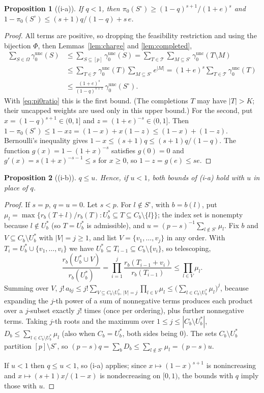 \documentclass[11pt]{article}
\newtheorem{proposition}{Proposition}
\theoremstyle{remark}
\newcommand{\unc}{\mathrm{unc}}
\newcommand{\gu}{\gamma_0^{\unc}}
\begin{document}
\begin{proposition}[(i-a)]
If $q<1$, then $\pi_0(S^\circ)\ge(1-q)^{s+1}/(1+e)^s$ and $1-\pi_0(S^\circ)\le (s+1)q/(1-q)+s\,e$.
\end{proposition}

\begin{proof}
All terms are positive, so dropping the feasibility restriction and using the bijection $\Phi$, then Lemmas~\ref{lem:charge} and \ref{lem:completed},
\[
\begin{aligned}
\sum_{S\in\Omega}\gu(S)&\le\sum_{S\subseteq[p]}\gu(S)=\sum_{T\in\mathcal T}\sum_{M\subseteq S^\circ}\gu(T\setminus M)\\
&\le\sum_{T\in\mathcal T}\gu(T)\sum_{M\subseteq S^\circ}e^{|M|}=(1+e)^s\sum_{T\in\mathcal T}\gu(T)\\
&\le\frac{(1+e)^s}{(1-q)^{s+1}}\,\gu(S^\circ).
\end{aligned}
\]
With \eqref{eq:pi0ratio} this is the first bound. (The completions $T$ may have $|T|>K$; their uncapped weights are used only in this upper bound.) For the second, put $x=(1-q)^{s+1}\in(0,1]$ and $z=(1+e)^{-s}\in(0,1]$. Then $1-\pi_0(S^\circ)\le 1-xz=(1-x)+x(1-z)\le(1-x)+(1-z)$. Bernoulli's inequality gives $1-x\le(s+1)q\le (s+1)q/(1-q)$. The function $g(x)=1-(1+x)^{-s}$ satisfies $g(0)=0$ and $g'(x)=s(1+x)^{-s-1}\le s$ for $x\ge0$, so $1-z=g(e)\le se$.
\end{proof}

\begin{proposition}[(i-b)]
$q\le u$. Hence, if $u<1$, both bounds of (i-a) hold with $u$ in place of $q$.
\end{proposition}

\begin{proof}
If $s=p$, $q=u=0$. Let $s<p$. For $l\notin S^\circ$, with $b=b(l)$, put $\mu_l=\max\{r_b(T+l)/r_b(T):U_b^*\subseteq T\subseteq C_b\setminus\{l\}\}$; the index set is nonempty because $l\notin U_b^*$ (so $T=U_b^*$ is admissible), and $u=(p-s)^{-1}\sum_{l\notin S^\circ}\mu_l$. Fix $b$ and $V\subseteq C_b\setminus U_b^*$ with $|V|=j\ge1$, and list $V=\{v_1,\dots,v_j\}$ in any order. With $T_i=U_b^*\cup\{v_1,\dots,v_i\}$ we have $U_b^*\subseteq T_{i-1}\subseteq C_b\setminus\{v_i\}$, so telescoping,
\[
\frac{r_b(U_b^*\cup V)}{r_b(U_b^*)}=\prod_{i=1}^{j}\frac{r_b(T_{i-1}+v_i)}{r_b(T_{i-1})}\le\prod_{l\in V}\mu_l .
\]
Summing over $V$, $j!\,a_{bj}\le j!\sum_{V\subseteq C_b\setminus U_b^*,\,|V|=j}\prod_{l\in V}\mu_l\le\bigl(\sum_{l\in C_b\setminus U_b^*}\mu_l\bigr)^j$, because expanding the $j$-th power of a sum of nonnegative terms produces each product over a $j$-subset exactly $j!$ times (once per ordering), plus further nonnegative terms. Taking $j$-th roots and the maximum over $1\le j\le|C_b\setminus U_b^*|$, $D_b\le\sum_{l\in C_b\setminus U_b^*}\mu_l$ (also when $C_b=U_b^*$, both sides being $0$). The sets $C_b\setminus U_b^*$ partition $[p]\setminus S^\circ$, so $(p-s)q=\sum_bD_b\le\sum_{l\notin S^\circ}\mu_l=(p-s)u$.

If $u<1$ then $q\le u<1$, so (i-a) applies; since $x\mapsto(1-x)^{s+1}$ is nonincreasing and $x\mapsto(s+1)x/(1-x)$ is nondecreasing on $[0,1)$, the bounds with $q$ imply those with $u$.
\end{proof}
\end{document}
